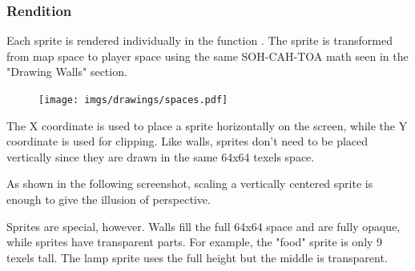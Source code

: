 \subsubsection{Rendition}
Each sprite is rendered individually in the function . The sprite is transformed from map space to player space using the same SOH-CAH-TOA math seen in the "Drawing Walls" section.

\par
\begin{figure}[H]
\centering
 \texttt{[image: imgs/drawings/spaces.pdf]}
 \end{figure}
\par
The X coordinate is used to place a sprite horizontally on the screen, while the Y coordinate is used for clipping. Like walls, sprites don't need to be placed vertically since they are drawn in the same 64x64 texels space.\\
\par
  \begin{minipage}{.5\textwidth}
  \end{minipage}
   \begin{minipage}{.5\textwidth} 
   \end{minipage}

\par



 As shown in the following screenshot, scaling a vertically centered sprite is enough to give the illusion of perspective.\\
\par
\begin{figure}[H]
 \centering
\end{figure}

Sprites are special, however. Walls fill the full 64x64 space and are fully opaque, while sprites have transparent parts. For example, the "food" sprite is only 9 texels tall. The lamp sprite uses the full height but the middle is transparent.\\


  \begin{minipage}{.5\textwidth} 
   \end{minipage}
  \begin{minipage}{.5\textwidth} 
   \end{minipage}

